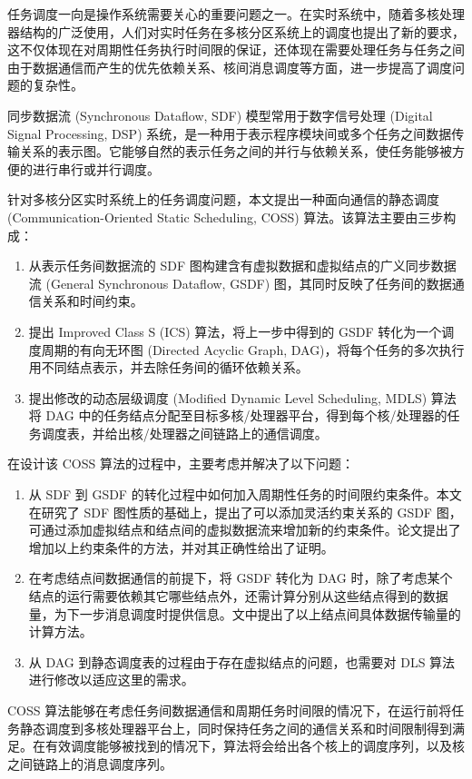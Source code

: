 ﻿%
\begin{cabstract}

任务调度一向是操作系统需要关心的重要问题之一。在实时系统中，随着多核处理器结构的广泛使用，人们对实时任务在多核分区系统上的调度也提出了新的要求，这不仅体现在对周期性任务执行时间限的保证，还体现在需要处理任务与任务之间由于数据通信而产生的优先依赖关系、核间消息调度等方面，进一步提高了调度问题的复杂性。

同步数据流 (Synchronous Dataflow, SDF) 模型常用于数字信号处理 (Digital Signal Processing, DSP) 系统，是一种用于表示程序模块间或多个任务之间数据传输关系的表示图。它能够自然的表示任务之间的并行与依赖关系，使任务能够被方便的进行串行或并行调度。

针对多核分区实时系统上的任务调度问题，本文提出一种面向通信的静态调度 (Communication-Oriented Static Scheduling, COSS) 算法。该算法主要由三步构成：
\begin{enumerate}
   \item 从表示任务间数据流的 SDF 图构建含有虚拟数据和虚拟结点的广义同步数据流 (General Synchronous Dataflow, GSDF) 图，其同时反映了任务间的数据通信关系和时间约束。
   \item 提出 Improved Class S (ICS) 算法，将上一步中得到的 GSDF 转化为一个调度周期的有向无环图 (Directed Acyclic Graph, DAG)，将每个任务的多次执行用不同结点表示，并去除任务间的循环依赖关系。
   \item 提出修改的动态层级调度 (Modified Dynamic Level Scheduling, MDLS) 算法将 DAG 中的任务结点分配至目标多核/处理器平台，得到每个核/处理器的任务调度表，并给出核/处理器之间链路上的通信调度。
 \end{enumerate}

在设计该 COSS 算法的过程中，主要考虑并解决了以下问题：
\begin{enumerate}
  \item 从 SDF 到 GSDF 的转化过程中如何加入周期性任务的时间限约束条件。本文在研究了 SDF 图性质的基础上，提出了可以添加灵活约束关系的 GSDF 图，可通过添加虚拟结点和结点间的虚拟数据流来增加新的约束条件。论文提出了增加以上约束条件的方法，并对其正确性给出了证明。
  \item 在考虑结点间数据通信的前提下，将 GSDF 转化为 DAG 时，除了考虑某个结点的运行需要依赖其它哪些结点外，还需计算分别从这些结点得到的数据量，为下一步消息调度时提供信息。文中提出了以上结点间具体数据传输量的计算方法。
  \item 从 DAG 到静态调度表的过程由于存在虚拟结点的问题，也需要对 DLS 算法进行修改以适应这里的需求。
\end{enumerate}


COSS 算法能够在考虑任务间数据通信和周期任务时间限的情况下，在运行前将任务静态调度到多核处理器平台上，同时保持任务之间的通信关系和时间限制得到满足。在有效调度能够被找到的情况下，算法将会给出各个核上的调度序列，以及核之间链路上的消息调度序列。

\end{cabstract}
